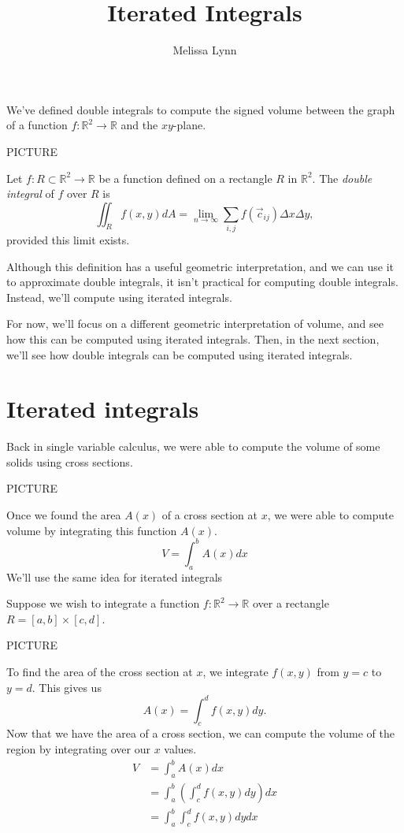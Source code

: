\documentclass{ximera}
\title{Iterated Integrals}
\author{Melissa Lynn}
\begin{document}
  
\begin{abstract}  
\end{abstract}  
\maketitle  

We've defined double integrals to compute the signed volume between the graph of a function $f:\mathbb{R}^2\rightarrow\mathbb{R}$ and the $xy$-plane.

PICTURE

\begin{definition}
Let $f:R\subset\mathbb{R}^2\rightarrow\mathbb{R}$ be a function defined on a rectangle $R$ in $\mathbb{R}^2$. The \emph{double integral} of $f$ over $R$ is
\[
\iint_R f(x,y) dA = \lim_{n\rightarrow \infty} \sum_{i,j} f(\vec{c}_{ij})\Delta x\Delta y,
\]
provided this limit exists.
\end{definition}

Although this definition has a useful geometric interpretation, and we can use it to approximate double integrals, it isn't practical for computing double integrals. Instead, we'll compute using iterated integrals.

For now, we'll focus on a different geometric interpretation of volume, and see how this can be computed using iterated integrals. Then, in the next section, we'll see how double integrals can be computed using iterated integrals.

\section*{Iterated integrals}

Back in single variable calculus, we were able to compute the volume of some solids using cross sections.

PICTURE

Once we found the area $A(x)$ of a cross section at $x$, we were able to compute volume by integrating this function $A(x)$.
\[
V = \int_a^b A(x)dx
\]
We'll use the same idea for iterated integrals

Suppose we wish to integrate a function $f:\mathbb{R}^2\rightarrow\mathbb{R}$ over a rectangle $R = [a,b] \times [c,d]$.

PICTURE

To find the area of the cross section at $x$, we integrate $f(x,y)$ from $y=c$ to $y=d$. This gives us
\[
A(x) = \int_c^d f(x,y)dy.
\]
Now that we have the area of a cross section, we can compute the volume of the region by integrating over our $x$ values.
\begin{align*}
V &= \int_a^b A(x)dx\\
&= \int_a^b\left(\int_c^d f(x,y)dy\right)dx\\
&= \int_a^b\int_c^d f(x,y)dydx\\
\end{align*}
\end{document}
